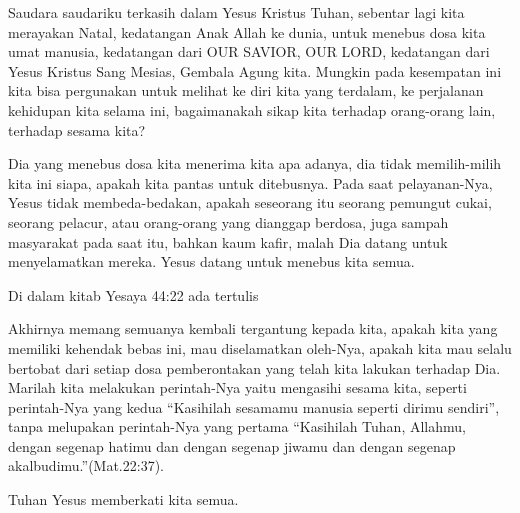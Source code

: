 Saudara saudariku terkasih dalam Yesus Kristus Tuhan, sebentar lagi kita merayakan Natal, kedatangan Anak Allah ke dunia, untuk menebus dosa kita umat manusia, kedatangan dari OUR SAVIOR, OUR LORD, kedatangan dari Yesus Kristus Sang Mesias, Gembala Agung kita. Mungkin pada kesempatan ini kita bisa pergunakan untuk melihat ke diri kita yang terdalam, ke perjalanan kehidupan kita selama ini, bagaimanakah sikap kita terhadap orang-orang lain, terhadap sesama kita?

Dia yang menebus dosa kita menerima kita apa adanya, dia tidak memilih-milih kita ini siapa, apakah kita pantas untuk ditebusnya. Pada saat pelayanan-Nya, Yesus tidak membeda-bedakan, apakah seseorang itu seorang pemungut cukai, seorang pelacur, atau orang-orang yang dianggap berdosa, juga sampah masyarakat pada saat itu, bahkan kaum kafir, malah Dia datang untuk menyelamatkan mereka. Yesus datang untuk menebus kita semua. 

Di dalam kitab Yesaya 44:22 ada tertulis 

Akhirnya memang semuanya kembali tergantung kepada kita, apakah kita yang memiliki kehendak bebas ini, mau diselamatkan oleh-Nya, apakah kita mau selalu bertobat dari setiap dosa pemberontakan yang telah kita lakukan terhadap Dia. Marilah kita melakukan perintah-Nya yaitu mengasihi sesama kita, seperti perintah-Nya yang kedua ``Kasihilah sesamamu manusia seperti dirimu sendiri'', tanpa melupakan perintah-Nya yang pertama ``Kasihilah Tuhan, Allahmu, dengan segenap hatimu dan dengan segenap jiwamu dan dengan segenap akalbudimu.''(Mat.22:37). 

Tuhan Yesus memberkati kita semua.

